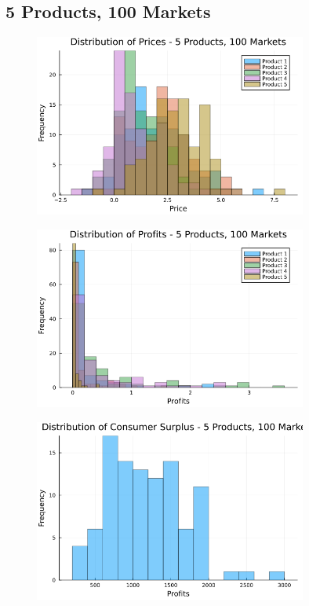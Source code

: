 \documentclass[11pt]{article}
\begin{document}
\subsection*{5 Products, 100 Markets}

\begin{figure}[H]
\centering
\includegraphics[width=0.8\textwidth]{outputs/prices_5prods_100mkts.png}
\end{figure}

\begin{figure}[H]
\centering
\includegraphics[width=0.8\textwidth]{outputs/profits_5prods_100mkts.png}
\end{figure}

\begin{figure}[H]
\centering
\includegraphics[width=0.8\textwidth]{outputs/cs_5prods_100mkts.png}
\end{figure}
\end{document}
